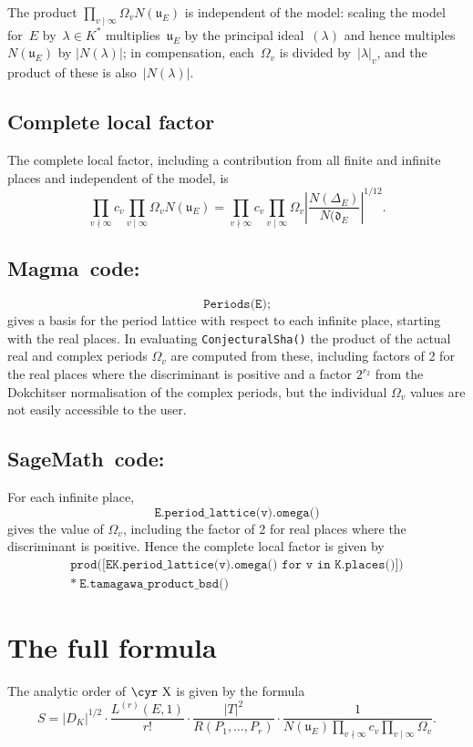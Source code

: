 \documentclass{amsart}
\newcommand{\software}[1]{\textsf{#1}} %
\newcommand{\Sage}{\software{SageMath}}
\newcommand{\Magma}{\software{Magma}{}}
\newcommand{\Sha}{\text{\cyr X}}
\begin{document}
The product \(\prod_{v\mid\infty}\Omega_v N(\mathfrak{u}_E)\) is
independent of the model: scaling the model for~$E$ by~$\lambda\in
K^*$ multiplies~$\mathfrak{u}_E$ by the principal ideal~$(\lambda)$
and hence multiples~\(N(\mathfrak{u}_E)\) by \(|N(\lambda)|\); in
compensation, each~\(\Omega_v\) is divided by~$|\lambda|_v$, and the
product of these is also~\(|N(\lambda)|\).

\subsection{Complete local factor}\label{complete-local-factor}
The complete local factor, including a contribution from all finite
and infinite places and independent of the model,  is
\[
\prod_{v\nmid\infty}c_v\prod_{v\mid\infty}\Omega_v N(\mathfrak{u}_E)
=
\prod_{v\nmid\infty}c_v\prod_{v\mid\infty}\Omega_v \left|\frac{N(\Delta_E)}{N(\mathfrak{d}_E}\right|^{1/12}.
\]

\subsection{\Magma\ code:}\label{magma-5}
\[
\texttt{Periods(E);}
\]
gives a basis for the period lattice with respect to each infinite
place, starting with the real places. In evaluating
\texttt{ConjecturalSha()} the product of the actual real and complex
periods \(\Omega_v\) are computed from these, including factors of 2
for the real places where the discriminant is positive and a factor
\(2^{r_2}\) from the Dokchitser normalisation of the complex periods,
but the individual \(\Omega_v\) values are not easily accessible to
the user.

\subsection{\Sage\ code:}\label{sage-5}
For each infinite place,
\[
\texttt{E.period\_lattice(v).omega()}
\]
gives the value of \(\Omega_v\), including the factor of 2 for real
places where the discriminant is positive.  Hence the complete local
factor is given by
\begin{multline*}
  \texttt{prod({[}EK.period\_lattice(v).omega()\ for\ v\ in\ K.places(){]})}\\
    *\ \texttt{E.tamagawa\_product\_bsd()}
\end{multline*}

\section{The full formula}\label{the-full-formula}
The analytic order of $\Sha$ is given by the formula
\[
S =
|D_K|^{1/2}
\cdot
\frac{L^{(r)}(E,1)}{r!}
\cdot
\frac{|T|^2}{R(P_1,\dots,P_r)}
\cdot
\frac{1}{N(\mathfrak{u}_E)\prod_{v\nmid\infty}c_v\prod_{v\mid\infty}\Omega_v}.
\]
\end{document}
